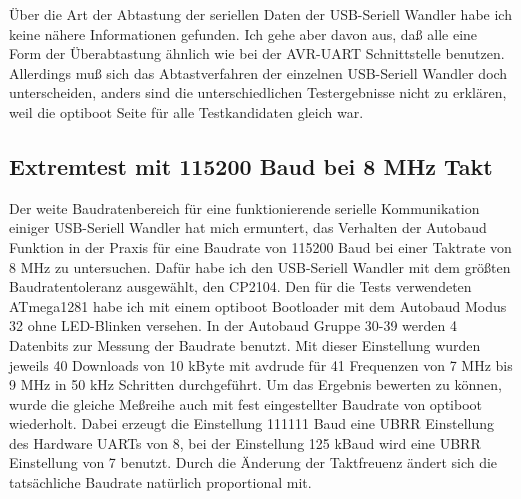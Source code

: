 Über die Art der Abtastung der seriellen Daten der USB-Seriell Wandler habe ich keine nähere Informationen
gefunden.
Ich gehe aber davon aus, daß alle eine Form der Überabtastung ähnlich wie bei der AVR-UART
Schnittstelle benutzen. Allerdings muß sich das Abtastverfahren der einzelnen USB-Seriell Wandler
doch unterscheiden, anders sind die unterschiedlichen Testergebnisse nicht zu erklären, weil
die optiboot Seite für alle Testkandidaten gleich war.

\subsection{Extremtest mit 115200 Baud bei 8 MHz Takt}

Der weite Baudratenbereich für eine funktionierende serielle Kommunikation einiger USB-Seriell Wandler
hat mich ermuntert, das Verhalten der Autobaud Funktion in der Praxis für eine Baudrate von 115200 Baud
bei einer Taktrate von 8 MHz zu untersuchen.
Dafür habe ich den USB-Seriell Wandler mit dem größten Baudratentoleranz ausgewählt, den CP2104. 
Den für die Tests verwendeten ATmega1281 habe ich mit einem optiboot Bootloader
mit dem Autobaud Modus 32 ohne LED-Blinken versehen. 
In der Autobaud Gruppe 30-39 werden 4 Datenbits zur Messung der Baudrate benutzt.
Mit dieser Einstellung wurden jeweils 40 Downloads von 10 kByte mit avdrude für 41 Frequenzen
von 7 MHz bis 9 MHz in 50 kHz Schritten durchgeführt.
Um das Ergebnis bewerten zu können, wurde die gleiche Meßreihe auch mit fest eingestellter Baudrate
von optiboot wiederholt. Dabei erzeugt die Einstellung 111111 Baud eine UBRR Einstellung des Hardware UARTs
von 8, bei der Einstellung 125 kBaud wird eine UBRR Einstellung von 7 benutzt.
Durch die Änderung der Taktfreuenz ändert sich die tatsächliche Baudrate natürlich proportional mit.

